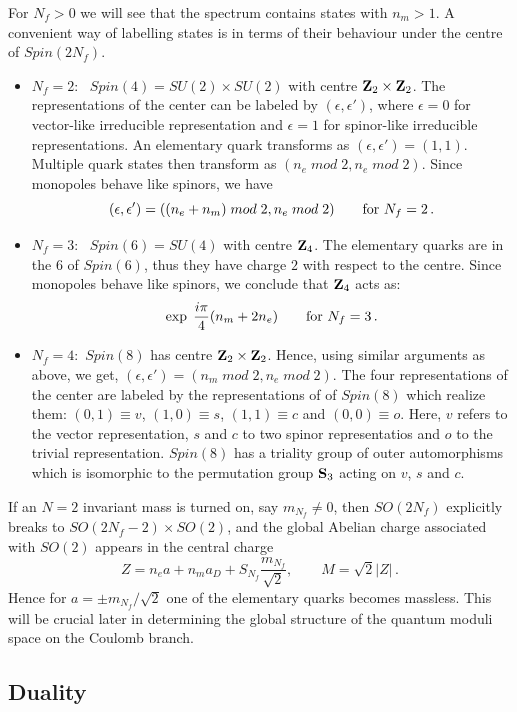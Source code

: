 For $N_f > 0$ we will see that the spectrum contains states with $n_m
> 1$. A convenient way of labelling states is in terms of their
behaviour under the centre of $Spin(2N_f)$.
\begin{itemize}
\item

$N_f = 2$: \, $Spin(4) = SU(2) \times SU(2)$ with centre ${\bf Z}_2
\times {\bf Z}_2$. The representations of the center can be labeled
by $(\epsilon , \epsilon ')$, where $\epsilon = 0$ for vector-like
irreducible representation and $\epsilon = 1$ for spinor-like
irreducible representations.  An elementary quark transforms as
$(\epsilon , \epsilon ') = (1,1)$. Multiple quark states then
transform as $(n_e \; mod \; 2, n_e \; mod \; 2)$. Since monopoles
behave like spinors, we have
$$
(\epsilon , \epsilon ') = ((n_e + n_m) \; mod \; 2, n_e \; mod \; 2)
\qquad {\rm for}\,\, {N_f = 2}\,.
$$
\item
$N_f = 3$: \, $Spin(6) = SU(4)$ with centre ${\bf Z}_{4}$.  The
elementary quarks are in the $6$ of $Spin (6)$, thus they have charge
$2$ with respect to the centre.  Since monopoles behave like spinors,
we conclude that ${\bf Z}_{4}$ acts as:
$$
\exp \; \frac{i \pi}{4} (n_m + 2n_e)
\qquad{\rm for} \,\,{N_f = 3}\,.
$$
\item
$N_f=4$:\, $Spin(8)$ has centre ${\bf Z}_2\times {\bf Z}_2$. Hence,
using similar arguments as above, we get,
$(\epsilon,\epsilon')$$=$$(n_m\; mod\; 2, n_e\; mod \; 2) $. The four
representations of the center are labeled by the representations of of
$Spin(8)$ which realize them: $(0,1)\equiv v$, $(1,0)\equiv s$,
$(1,1)\equiv c$ and $(0,0)\equiv o$.  Here, $v$ refers to the vector
representation, $s$ and $c$ to two spinor representatios and $o$ to
the trivial representation. $Spin(8)$ has a triality group of outer
automorphisms which is isomorphic to the permutation group ${\bf S}_3$
acting on $v$, $s$ and $c$.
\end{itemize}

If an $N = 2$ invariant mass is turned on, say $m_{N_f} \not= 0$,
then $SO(2N_f)$ explicitly breaks to $SO(2N_f-2) \times SO(2)$, and
the global Abelian charge associated with $SO(2)$ appears in the
central charge 
$$
Z = n_e a + n_m a_D +S_{N_f} \frac{m_{N_f}}{\sqrt{2}},\qquad
M = \sqrt{2} |Z|\,.
$$
Hence for $a = \pm m_{N_f} / \sqrt{2}$ one of the elementary quarks
becomes massless. This will be crucial later in determining the global
structure of the quantum moduli space on the Coulomb branch.

\subsection{Duality}

